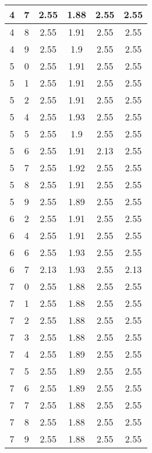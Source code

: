 \begin{longtable}{|c|c||c||c|c||c|}
	4 & 7 & 2.55 & 1.88 & 2.55 & 2.55 \\ \hline
	4 & 8 & 2.55 & 1.91 & 2.55 & 2.55 \\ \hline
	4 & 9 & 2.55 & 1.9 & 2.55 & 2.55 \\ \hline
	5 & 0 & 2.55 & 1.91 & 2.55 & 2.55 \\ \hline
	5 & 1 & 2.55 & 1.91 & 2.55 & 2.55 \\ \hline
	5 & 2 & 2.55 & 1.91 & 2.55 & 2.55 \\ \hline
	5 & 4 & 2.55 & 1.93 & 2.55 & 2.55 \\ \hline
	5 & 5 & 2.55 & 1.9 & 2.55 & 2.55 \\ \hline
	5 & 6 & 2.55 & 1.91 & 2.13 & 2.55 \\ \hline
	5 & 7 & 2.55 & 1.92 & 2.55 & 2.55 \\ \hline
	5 & 8 & 2.55 & 1.91 & 2.55 & 2.55 \\ \hline
	5 & 9 & 2.55 & 1.89 & 2.55 & 2.55 \\ \hline
	6 & 2 & 2.55 & 1.91 & 2.55 & 2.55 \\ \hline
	6 & 4 & 2.55 & 1.91 & 2.55 & 2.55 \\ \hline
	6 & 6 & 2.55 & 1.93 & 2.55 & 2.55 \\ \hline
	6 & 7 & 2.13 & 1.93 & 2.55 & 2.13 \\ \hline
	7 & 0 & 2.55 & 1.88 & 2.55 & 2.55 \\ \hline
	7 & 1 & 2.55 & 1.88 & 2.55 & 2.55 \\ \hline
	7 & 2 & 2.55 & 1.88 & 2.55 & 2.55 \\ \hline
	7 & 3 & 2.55 & 1.88 & 2.55 & 2.55 \\ \hline
	7 & 4 & 2.55 & 1.89 & 2.55 & 2.55 \\ \hline
	7 & 5 & 2.55 & 1.89 & 2.55 & 2.55 \\ \hline
	7 & 6 & 2.55 & 1.89 & 2.55 & 2.55 \\ \hline
	7 & 7 & 2.55 & 1.88 & 2.55 & 2.55 \\ \hline
	7 & 8 & 2.55 & 1.88 & 2.55 & 2.55 \\ \hline
	7 & 9 & 2.55 & 1.88 & 2.55 & 2.55 \\ \hline
\end{longtable}
\clearpage{}

